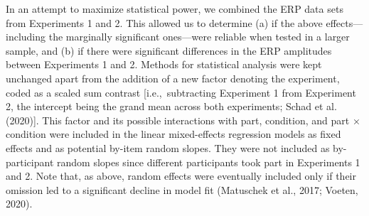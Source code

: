 \documentclass[
  english,
  doc,12pt,twoside,floatsintext]{apa7}
\begin{document}
In an attempt to maximize statistical power, we combined the ERP data sets from Experiments 1 and 2. This allowed us to determine (a) if the above effects---including the marginally significant ones---were reliable when tested in a larger sample, and (b) if there were significant differences in the ERP amplitudes between Experiments 1 and 2. Methods for statistical analysis were kept unchanged apart from the addition of a new factor denoting the experiment, coded as a scaled sum contrast {[}i.e.,~subtracting Experiment 1 from Experiment 2, the intercept being the grand mean across both experiments; Schad et al. (2020){]}. This factor and its possible interactions with part, condition, and part × condition were included in the linear mixed-effects regression models as fixed effects and as potential by-item random slopes. They were not included as by-participant random slopes since different participants took part in Experiments 1 and 2. Note that, as above, random effects were eventually included only if their omission led to a significant decline in model fit (Matuschek et al., 2017; Voeten, 2020).
\end{document}

